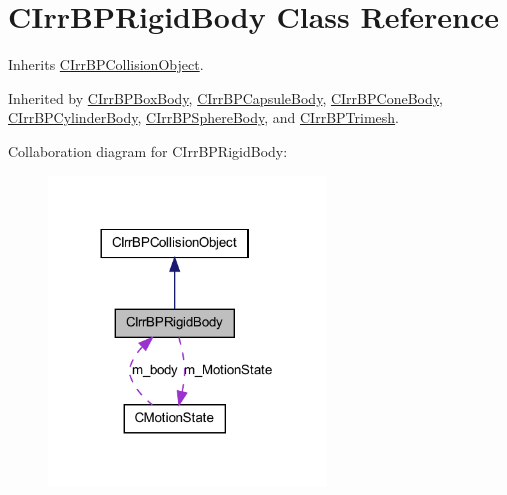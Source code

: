 \hypertarget{class_c_irr_b_p_rigid_body}{
\section{CIrrBPRigidBody Class Reference}
\label{class_c_irr_b_p_rigid_body}
}


Inherits \hyperlink{class_c_irr_b_p_collision_object}{CIrrBPCollisionObject}.



Inherited by \hyperlink{class_c_irr_b_p_box_body}{CIrrBPBoxBody}, \hyperlink{class_c_irr_b_p_capsule_body}{CIrrBPCapsuleBody}, \hyperlink{class_c_irr_b_p_cone_body}{CIrrBPConeBody}, \hyperlink{class_c_irr_b_p_cylinder_body}{CIrrBPCylinderBody}, \hyperlink{class_c_irr_b_p_sphere_body}{CIrrBPSphereBody}, and \hyperlink{class_c_irr_b_p_trimesh}{CIrrBPTrimesh}.



Collaboration diagram for CIrrBPRigidBody:\nopagebreak
\begin{figure}[H]
\begin{center}
\leavevmode
\includegraphics[width=209pt]{class_c_irr_b_p_rigid_body__coll__graph}
\end{center}
\end{figure}
